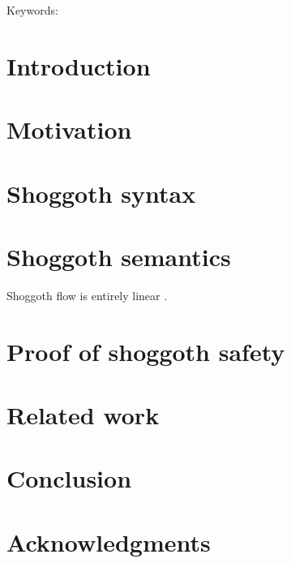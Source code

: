 \begin{abstract}
  
\end{abstract}

\maketitle

\iffinalformat
    Keywords: 
\fi

\section{Introduction}
\label{sec:intro}

\section{Motivation}
\label{sec:motivation}

\section{Shoggoth syntax}
\label{sec:syntax}

\section{Shoggoth semantics}
\label{sec:semantics}

Shoggoth flow is entirely linear \cite{zm02-hosc}.

\section{Proof of shoggoth safety}
\label{sec:safety}

\section{Related work}
\label{sec:related}

\section{Conclusion}
\label{sec:conclusions}

\ifacknowledgments
\section*{Acknowledgments}


\fi



